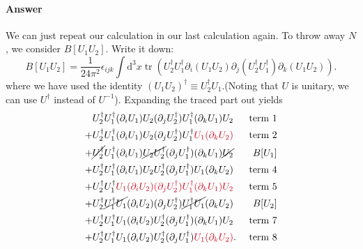 \documentclass{book}
\begin{document}
\paragraph{Answer}
We can just repeat our calculation in our last calculation again. To throw away $N$, we consider $B[ U_{1} U_{2}]$. Write it down:
\begin{equation*}
B[ U_{1} U_{2}] =\frac{1}{24\pi ^{2}} \epsilon _{ijk}\int \mathrm{d}^{3} x\operatorname{tr} (U_{2}^{\dagger } U_{1}^{\dagger } \partial _{i}( U_{1} U_{2}) \partial _{j} (U_{2}^{\dagger } U_{1}^{\dagger } )\partial _{k}( U_{1} U_{2}) ).
\end{equation*}
where we have used the identity $( U_{1} U_{2})^{\dagger } \equiv U_{2}^{\dagger } U_{1}$.(Noting that $U$ is unitary, we can use $U^{\dagger }$ instead of $U^{-1}$). Expanding the traced part out yields
\begin{equation*}
\begin{aligned}
 & U_{2}^{\dagger } U_{1}^{\dagger }( \partial _{i} U_{1}) U_{2} (\partial _{j} U_{2}^{\dagger } )U_{1}^{\dagger }( \partial _{k} U_{1}) U_{2} & \text{ term } 1\\
+ & U_{2}^{\dagger } U_{1}^{\dagger }( \partial _{i} U_{1}) U_{2} (\partial _{j} U_{2}^{\dagger } )U_{1}^{\dagger }\textcolor[rgb]{0.82,0.01,0.11}{U_{1}( \partial _{k} U_{2})} & \text{ term } 2\\
+ & \cancel{U_{2}^{\dagger }} U_{1}^{\dagger }( \partial _{i} U_{1})\cancel{U_{2} U_{2}^{\dagger }} (\partial _{j} U_{1}^{\dagger } )( \partial _{k} U_{1})\cancel{U_{2}} & B[ U_{1}]\\
+ & U_{2}^{\dagger } U_{1}^{\dagger }( \partial _{i} U_{1}) U_{2} U_{2}^{\dagger } (\partial _{j} U_{1}^{\dagger } )U_{1}( \partial _{k} U_{2}) & \text{ term } 4\\
+ & U_{2}^{\dagger } U_{1}^{\dagger }\textcolor[rgb]{0.82,0.01,0.11}{U_{1}( \partial _{i} U_{2}) (\partial _{j} U_{2}^{\dagger } )U_{1}^{\dagger }( \partial _{k} U_{1}) U_{2}} & \text{ term } 5\\
+ & U_{2}^{\dagger }\cancel{U_{1}^{\dagger } U_{1}}( \partial _{i} U_{2}) (\partial _{j} U_{2}^{\dagger } )\cancel{U_{1}^{\dagger } U_{1}}( \partial _{k} U_{2}) & B[ U_{2}]\\
+ & U_{2}^{\dagger } U_{1}^{\dagger } U_{1}( \partial _{i} U_{2}) U_{2}^{\dagger } (\partial _{j} U_{1}^{\dagger } )( \partial _{k} U_{1}) U_{2} & \text{ term } 7\\
+ & U_{2}^{\dagger } U_{1}^{\dagger } U_{1}( \partial _{i} U_{2}) U_{2}^{\dagger } (\partial _{j} U_{1}^{\dagger } )\textcolor[rgb]{0.82,0.01,0.11}{U_{1}( \partial _{k} U_{2})} . & \text{ term } 8
\end{aligned}
\end{equation*}
\end{document}
